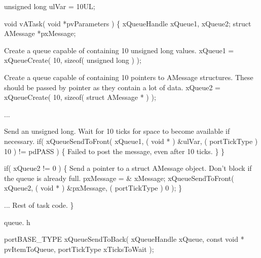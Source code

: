 \begin{DoxyPre} unsigned long ulVar = 10UL;\end{DoxyPre}



\begin{DoxyPre} void vATask( void *pvParameters )
 \{
 xQueueHandle xQueue1, xQueue2;
 struct AMessage *pxMessage;\end{DoxyPre}



\begin{DoxyPre}Create a queue capable of containing 10 unsigned long values.
    xQueue1 = xQueueCreate( 10, sizeof( unsigned long ) );\end{DoxyPre}



\begin{DoxyPre}Create a queue capable of containing 10 pointers to AMessage structures.
These should be passed by pointer as they contain a lot of data.
    xQueue2 = xQueueCreate( 10, sizeof( struct AMessage * ) );\end{DoxyPre}



\begin{DoxyPre}...
\begin{DoxyVerb}if( xQueue1 != 0 )
{
\end{DoxyVerb}

Send an unsigned long.  Wait for 10 ticks for space to become
available if necessary.
        if( xQueueSendToFront( xQueue1, ( void * ) \&ulVar, ( portTickType ) 10 ) != pdPASS )
        \{
Failed to post the message, even after 10 ticks.
        \}
    \}\end{DoxyPre}



\begin{DoxyPre}    if( xQueue2 != 0 )
    \{
Send a pointer to a struct AMessage object.  Don't block if the
queue is already full.
        pxMessage = \& xMessage;
        xQueueSendToFront( xQueue2, ( void * ) \&pxMessage, ( portTickType ) 0 );
    \}\end{DoxyPre}



\begin{DoxyPre}... Rest of task code.
 \}
 \end{DoxyPre}


queue. h 
\begin{DoxyPre}
 portBASE\_TYPE xQueueSendToBack(
                                   xQueueHandle xQueue,
                                   const    void    *   pvItemToQueue,
                                   portTickType xTicksToWait
                               );
   \end{DoxyPre}


